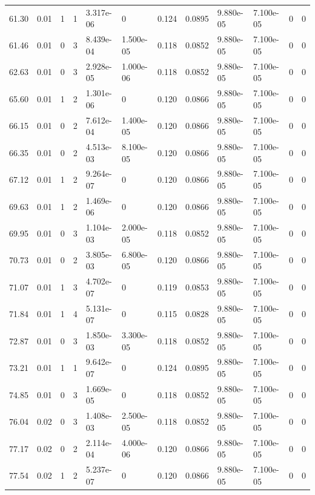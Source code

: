 \documentclass[preview]{standalone}
\begin{document}
{{{\begin{tabular}{L{1.2cm}C{1.2cm} C{0.3cm}C{0.5cm} C{1.4cm}C{1.4cm} C{1.4cm}C{1.4cm} C{1.6cm}C{1.6cm} C{1.6cm}C{1.6cm}}
  61.30  &  0.01  & 1     &  1 &  3.317e-06  & 0  &  0.124&   0.0895& 9.880e-05 & 7.100e-05   &  0 & 0  \\ 
  61.46  &  0.01  & 0     &  3 &  8.439e-04  & 1.500e-05  &  0.118&   0.0852& 9.880e-05 & 7.100e-05   &  0 & 0  \\ 
  62.63  &  0.01  & 0     &  3 &  2.928e-05  & 1.000e-06  &  0.118&   0.0852& 9.880e-05 & 7.100e-05   &  0 & 0  \\ 
  65.60  &  0.01  & 1     &  2 &  1.301e-06  & 0  &  0.120&   0.0866& 9.880e-05 & 7.100e-05   &  0 & 0  \\ 
  66.15  &  0.01  & 0     &  2 &  7.612e-04  & 1.400e-05  &  0.120&   0.0866& 9.880e-05 & 7.100e-05   &  0 & 0  \\ 
  66.35  &  0.01  & 0     &  2 &  4.513e-03  & 8.100e-05  &  0.120&   0.0866& 9.880e-05 & 7.100e-05   &  0 & 0  \\ 
  67.12  &  0.01  & 1     &  2 &  9.264e-07  & 0  &  0.120&   0.0866& 9.880e-05 & 7.100e-05   &  0 & 0  \\ 
  69.63  &  0.01  & 1     &  2 &  1.469e-06  & 0  &  0.120&   0.0866& 9.880e-05 & 7.100e-05   &  0 & 0  \\ 
  69.95  &  0.01  & 0     &  3 &  1.104e-03  & 2.000e-05  &  0.118&   0.0852& 9.880e-05 & 7.100e-05   &  0 & 0  \\ 
  70.73  &  0.01  & 0     &  2 &  3.805e-03  & 6.800e-05  &  0.120&   0.0866& 9.880e-05 & 7.100e-05   &  0 & 0  \\ 
  71.07  &  0.01  & 1     &  3 &  4.702e-07  & 0  &  0.119&   0.0853& 9.880e-05 & 7.100e-05   &  0 & 0  \\ 
  71.84  &  0.01  & 1     &  4 &  5.131e-07  & 0  &  0.115&   0.0828& 9.880e-05 & 7.100e-05   &  0 & 0  \\ 
  72.87  &  0.01  & 0     &  3 &  1.850e-03  & 3.300e-05  &  0.118&   0.0852& 9.880e-05 & 7.100e-05   &  0 & 0  \\ 
  73.21  &  0.01  & 1     &  1 &  9.642e-07  & 0  &  0.124&   0.0895& 9.880e-05 & 7.100e-05   &  0 & 0  \\ 
  74.85  &  0.01  & 0     &  3 &  1.669e-05  & 0  &  0.118&   0.0852& 9.880e-05 & 7.100e-05   &  0 & 0  \\ 
  76.04  &  0.02  & 0     &  3 &  1.408e-03  & 2.500e-05  &  0.118&   0.0852& 9.880e-05 & 7.100e-05   &  0 & 0  \\ 
  77.17  &  0.02  & 0     &  2 &  2.114e-04  & 4.000e-06  &  0.120&   0.0866& 9.880e-05 & 7.100e-05   &  0 & 0  \\ 
  77.54  &  0.02  & 1     &  2 &  5.237e-07  & 0  &  0.120&   0.0866& 9.880e-05 & 7.100e-05   &  0 & 0  \\ 

\end{tabular}}}}
\end{document}
